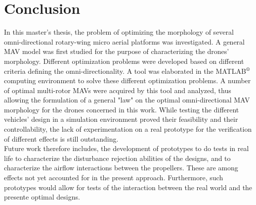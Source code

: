 \chapter{Conclusion}
\label{sec:conclusion}
In this master’s thesis, the problem of optimizing the morphology of several omni-directional
rotary-wing micro aerial platforms was investigated. A general MAV model was first
studied for the purpose of characterizing the drones' morphology. Different optimization
problems were developed based on different criteria defining the omni-directionality.
A tool was elaborated in the MATLAB$^\textrm{\textregistered}$ computing environment
to solve these different optimization problems. A number of optimal multi-rotor MAVs were
acquired by this tool and analyzed, thus allowing the formulation of a general "law" on the
optimal omni-directional MAV morphology for the drones concerned in this work.
While testing the different vehicles' design
in a simulation environment proved their feasibility and their controllability, the lack of
experimentation on a real prototype for the verification of different effects is still outstanding.\\
Future work therefore includes, the development of prototypes to do tests in real life to
characterize the disturbance rejection abilities of the designs, and to characterize the airflow
interactions between the propellers. These are among effects not yet accounted for in the present approach.
Furthermore, such prototypes would allow for tests of the interaction between the real world and
the presente optimal designs.
